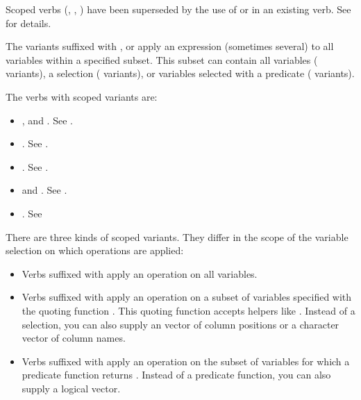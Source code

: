 \documentclass[a4paper]{book}
\begin{document}
\begin{Description}
\strong{[Superseded]}

Scoped verbs (, , ) have been superseded by the use of
 or  in an existing verb. See  for
details.

The variants suffixed with ,  or  apply an
expression (sometimes several) to all variables within a specified
subset. This subset can contain all variables ( variants), a
 selection ( variants), or variables selected with a
predicate ( variants).

The verbs with scoped variants are:
\begin{itemize}

\item{} ,  and . See .
\item{} . See .
\item{} . See .
\item{}  and . See .
\item{} . See 

\end{itemize}


There are three kinds of scoped variants. They differ in the scope
of the variable selection on which operations are applied:
\begin{itemize}

\item{} Verbs suffixed with  apply an operation on all variables.
\item{} Verbs suffixed with  apply an operation on a subset of
variables specified with the quoting function . This
quoting function accepts  helpers like
. Instead of a  selection, you can also
supply an  vector of column
positions or a character vector of column names.
\item{} Verbs suffixed with  apply an operation on the subset of
variables for which a predicate function returns . Instead
of a predicate function, you can also supply a logical vector.

\end{itemize}

\end{Description}
\end{document}
